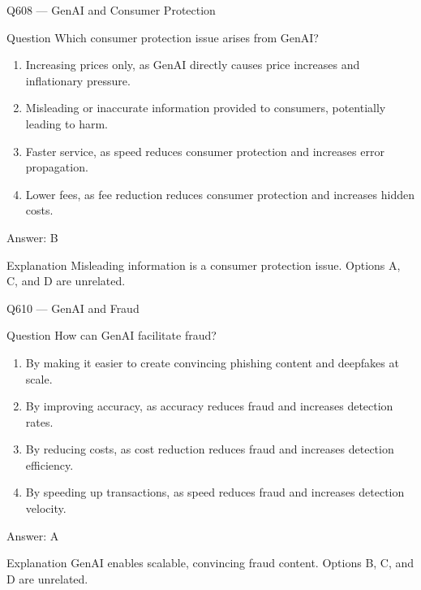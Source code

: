 \documentclass[aspectratio=169,8pt]{beamer}
\begin{document}
	\begin{frame}{Q608 --- GenAI and Consumer Protection}
		\begin{block}{Question}
			Which consumer protection issue arises from GenAI?
			\begin{enumerate}
				\item Increasing prices only, as GenAI directly causes price increases and inflationary pressure.
				\item Misleading or inaccurate information provided to consumers, potentially leading to harm.
				\item Faster service, as speed reduces consumer protection and increases error propagation.
				\item Lower fees, as fee reduction reduces consumer protection and increases hidden costs.
			\end{enumerate}
		\end{block}
		\begin{exampleblock}{Answer: B}\end{exampleblock}
		\begin{block}{Explanation}
			Misleading information is a consumer protection issue. Options A, C, and D are unrelated.
		\end{block}
	\end{frame}
	

	
	\begin{frame}{Q610 --- GenAI and Fraud}
		\begin{block}{Question}
			How can GenAI facilitate fraud?
			\begin{enumerate}
				\item By making it easier to create convincing phishing content and deepfakes at scale.
				\item By improving accuracy, as accuracy reduces fraud and increases detection rates.
				\item By reducing costs, as cost reduction reduces fraud and increases detection efficiency.
				\item By speeding up transactions, as speed reduces fraud and increases detection velocity.
			\end{enumerate}
		\end{block}
		\begin{exampleblock}{Answer: A}\end{exampleblock}
		\begin{block}{Explanation}
			GenAI enables scalable, convincing fraud content. Options B, C, and D are unrelated.
		\end{block}
	\end{frame}
	
\end{document}
